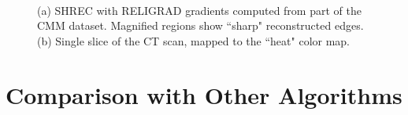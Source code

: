 \begin{figure}[htb]
	\centering
	\\
	\caption{(a) SHREC with RELIGRAD gradients computed from part of the CMM dataset. Magnified regions show ``sharp" reconstructed edges. (b) Single slice of the CT scan, mapped to the ``heat" color map.}\label{fig:ict:CMM}
\end{figure}

\section{Comparison with Other Algorithms}
\label{section:comparison}
